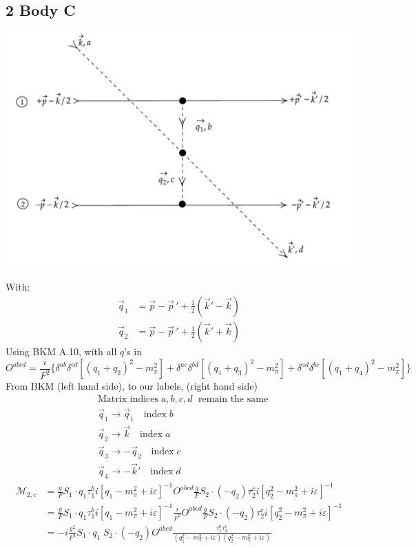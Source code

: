 \documentclass[11pt]{article}
\newcommand\mm{\mathcal{M}}
\newcommand{\mpi}{m_\pi}
\begin{document}
\subsection{2 Body C}
\begin{center}
    \includegraphics[scale=0.8]{2c.pdf}
\end{center}
With:
\begin{align}
    \vec{q}_1&= \vec{p}-\vec{p}\,' + \frac{1}{2} ( \vec{k}'-\vec{k})\\
    \vec{q}_2&= \vec{p}-\vec{p}\,' + \frac{1}{2} ( \vec{k}'+\vec{k})
\end{align}
Using BKM A.10, with all $q$'s in
\begin{equation}
    O^{abcd}=\frac{i}{F^2} \Bigg\{
         \delta^{ab}\delta^{cd} \left[ (q_1+q_2)^2 - \mpi^2 \right]+
    \delta^{ac}\delta^{bd} \left[ \left( q_1+q_3\right)^2 -m_\pi^2 \right]
             +\delta^{ad}\delta^{bc} \left[ \left(q_1+q_4 \right)^2 - m_\pi^2 \right]
     \Bigg\}
\end{equation}
From BKM (left hand side), to our labels, (right hand side)
\begin{align}
    &\text{Matrix indices}\;a,b,c,d\;\text{ remain the same}\\
    &\vec q_1 \to \vec{q}_1\quad \text{index}\;b \\
    &\vec q_2 \to \vec{k}\quad \text{index}\;a \\
    &\vec q_3 \to -\vec{q}_2\quad \text{index}\;c \\
    &\vec q_4 \to -\vec{k}'\quad \text{index}\;d
\end{align}
\begin{align}
    \mm_{2,c}&=\frac{g}{F} S_1 \cdot q_1 \tau_1^b  i \left[ q_1 -m_\pi^2 + i \varepsilon \right]^{-1}
     O^{abcd}
    \frac{g}{F}   S_2 \cdot(-q_2) \tau_2^c
    i \left[ q_2^2 -m_\pi^2 + i \varepsilon \right]^{-1}\\
    &=\frac{g}{F} S_1 \cdot q_1 \tau_1^b  i \left[ q_1 -m_\pi^2 + i \varepsilon \right]^{-1}
     \frac{i}{F^2} 
     O^{abcd}
    \frac{g}{F}   S_2 \cdot(-q_2) \tau_2^c
    i \left[ q_2^2 -m_\pi^2 + i \varepsilon \right]^{-1}\\
    &=-i \frac{g^2}{F^4} S_1 \cdot q_1\; S_2 \cdot(-q_2) O^{abcd}
    \frac{\tau_1^b \tau_2^c}{
    (q_1^2 -m_\pi^2 + i \varepsilon)
    (q_2^2-m_\pi^2 + i \varepsilon)
    }
\end{align}
\end{document}

